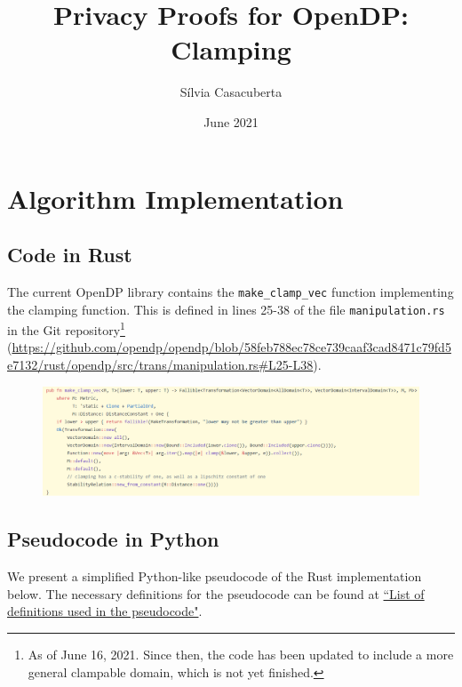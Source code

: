 \documentclass[11pt,a4paper]{article}
\title{Privacy Proofs for OpenDP: Clamping}
\author{S\'ilvia Casacuberta}
\date{June 2021}
\theoremstyle{definition}
\begin{document}
\maketitle

\section{Algorithm Implementation}


\subsection{Code in Rust}
The current OpenDP library contains the \texttt{make\_clamp\_vec} function implementing the clamping function. This is defined in lines 25-38 of the file \texttt{manipulation.rs} in the Git repository\footnote{As of June 16, 2021. Since then, the code has been updated to include a more general clampable domain, which is not yet finished.} (\url{https://github.com/opendp/opendp/blob/58feb788ec78ce739caaf3cad8471c79fd5e7132/rust/opendp/src/trans/manipulation.rs#L25-L38}).

\begin{figure}[ht]
    \includegraphics[width=16cm]{clamp_rust.png}
    \centering
    \label{fig:code}
\end{figure}


\subsection{Pseudocode in Python}\label{sec:pseudocode}
We present a simplified Python-like pseudocode of the Rust implementation below. The necessary definitions for the pseudocode can be found at \href{https://www.overleaf.com/project/60d215bf90b337ac02200a99}{``List of definitions used in the pseudocode"}.
\end{document}
